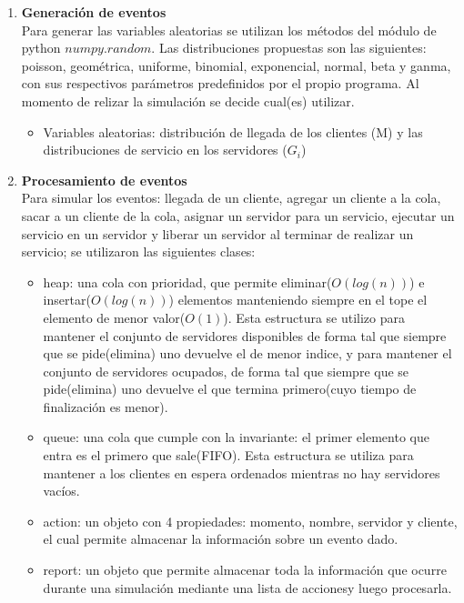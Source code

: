 \documentclass[article]{amsart}
\begin{document}
\begin{enumerate}
\item \textbf{Generaci\'on de eventos}\\
Para generar las variables aleatorias se utilizan los m\'etodos del m\'odulo de python $numpy.random$. Las distribuciones propuestas son las siguientes: poisson, geom\'etrica, uniforme, binomial, exponencial, normal, beta y ganma, con sus respectivos par\'ametros predefinidos por el propio programa. Al momento de relizar la simulaci\'on se decide cual(es) utilizar.\\
\begin{itemize}
\item Variables aleatorias: distribución de llegada de los clientes (M) y las distribuciones de servicio en los servidores ($G_{i}$)\\
\end{itemize}
\item \textbf{Procesamiento de eventos}\\
Para simular los eventos: llegada de un cliente, agregar un cliente a la cola, sacar a un cliente de la cola, asignar un servidor para un servicio, ejecutar un servicio en un servidor y liberar un servidor al terminar de realizar un servicio; se utilizaron las siguientes clases: \\
\begin{itemize}
\item heap: una cola con prioridad, que permite eliminar($O(log(n))$) e insertar($O(log(n))$) elementos manteniendo siempre en el tope el elemento de menor valor($O(1)$). Esta estructura se utilizo para mantener el conjunto de servidores disponibles de forma tal que siempre que se pide(elimina) uno devuelve el de menor indice, y para mantener el conjunto de servidores ocupados, de forma tal que siempre que se pide(elimina) uno devuelve el que termina primero(cuyo tiempo de finalizaci\'on es menor). \\
\item queue: una cola que cumple con la invariante: el primer elemento que entra es el primero que sale(FIFO). Esta estructura se utiliza para mantener a los clientes en espera ordenados mientras no hay servidores vac\'ios.\\
\item action: un objeto con 4 propiedades: momento, nombre, servidor y cliente, el cual permite almacenar la informaci\'on sobre un evento dado.\\
\item report: un objeto que permite almacenar toda la informaci\'on que ocurre durante una simulaci\'on mediante una lista de accionesy luego procesarla.\\

\end{itemize}
\end{enumerate}
\end{document}
